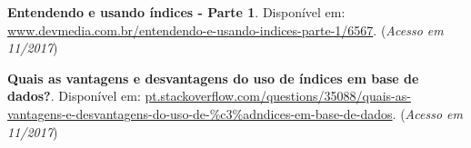 \documentclass[12pt,a4paper]{article}
\begin{document}
\noindent \textbf{Entendendo e usando índices - Parte 1}. Disponível em: \url {www.devmedia.com.br/entendendo-e-usando-indices-parte-1/6567}. (\textit{Acesso em 11/2017})\\\vspace{0.2cm}

\noindent \textbf{Quais as vantagens e desvantagens do uso de índices em base de dados?}. Disponível em: \url {pt.stackoverflow.com/questions/35088/quais-as-vantagens-e-desvantagens-do-uso-de-\%c3\%adndices-em-base-de-dados}. (\textit{Acesso em 11/2017})
\end{document}
